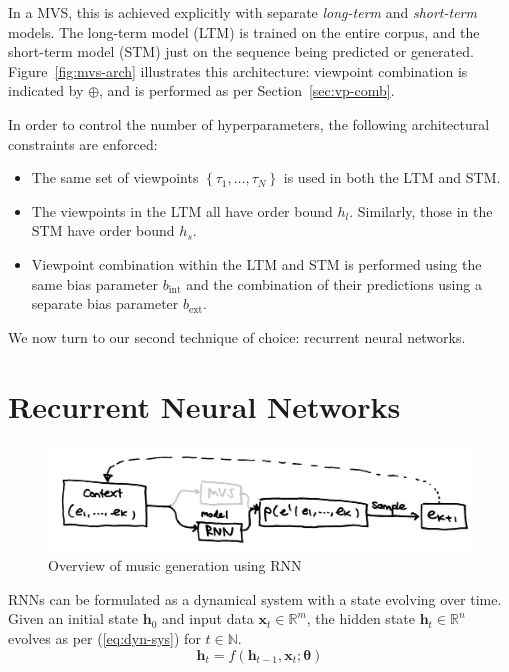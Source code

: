 \documentclass[12pt,a4paper,twoside,openright]{report}
\newcommand{\set}[1]{ \left\{ #1 \right\} }
\newcommand{\vect}[1]{\boldsymbol{\mathbf{#1}}}
\begin{document}
In a MVS, this is achieved explicitly with separate \emph{long-term} and
\emph{short-term} models. The long-term model (LTM) is trained on the entire
corpus, and the short-term model (STM) just on the sequence being predicted or
generated. Figure~\ref{fig:mvs-arch} illustrates this architecture: viewpoint
combination is indicated by $\oplus$, and is performed as per
Section~\ref{sec:vp-comb}.

In order to control the number of hyperparameters, the following architectural
constraints are enforced:
\begin{itemize}
  \item The same set of viewpoints $\set{\tau_1, \ldots, \tau_N}$ is used in both
    the LTM and STM. 
  \item The viewpoints in the LTM all have order bound $h_l$. Similarly, those
    in the STM have order bound $h_s$.
  \item Viewpoint combination within the LTM and STM is performed using the same
    bias parameter $b_{\mathrm{int}}$ and the combination of their predictions
    using a separate bias parameter $b_{\mathrm{ext}}$.
\end{itemize}

\vspace{8mm}

We now turn to our second technique of choice: recurrent neural networks.

\section{Recurrent Neural Networks}\label{sec:rnn-intro}

\begin{figure}[H]
\centering
\includegraphics[width=400pt]{figs/high_level_rnn_tmp.jpg}
\caption{Overview of music generation using RNN}
\label{fig:rnn-gen-overview}
\end{figure}

RNNs can be formulated as a dynamical system with a state evolving over time.
Given an initial state $\vect{h}_0$ and input data $\vect{x}_t \in
\mathbb{R}^m$, the hidden state $\vect{h}_t \in \mathbb{R}^n$ evolves as per
(\ref{eq:dyn-sys}) for $t \in \mathbb{N}$.
\begin{equation}
  \vect{h}_t = f(\vect{h}_{t-1}, \vect{x}_t; \vect{\theta})
  \label{eq:dyn-sys}
\end{equation} 
\end{document}

